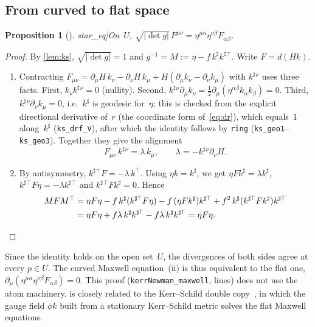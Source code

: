 \documentclass[11pt]{article}
\newtheorem{proposition}[theorem]{Proposition}
\theoremstyle{definition}
\theoremstyle{remark}
\newcommand{\lean}[1]{\lstinline[basicstyle=\ttfamily\normalsize,columns=fullflexible,breaklines=false]{#1}}
\newcommand{\ksharp}{k^{\sharp}}
\begin{document}
\subsection{From curved to flat space}\label{sec:curved-to-flat}

\begin{proposition}[\lean{star_eq}]\label{prop:flat}
On~$U$, $\sqrt{|\det g|}\,F^{\mu\nu}=\eta^{\mu\alpha}\eta^{\nu\beta}F_{\alpha\beta}$.
\end{proposition}
\begin{proof}
By \cref{lem:ks}, $\sqrt{|\det g|}=1$ and $g^{-1}=M:=\eta-f\,\ksharp\ksharp{}^{\!\top}$.
Write $F=d(Hk)$.
\begin{enumerate}[label=(\roman*)]
  \item Contracting $F_{\mu\nu}=\partial_\mu H\,k_\nu-\partial_\nu H\,k_\mu+H(\partial_\mu k_\nu-\partial_\nu k_\mu)$ with $\ksharp{}^\nu$ uses three facts.
  First, $k_\nu\ksharp{}^\nu=0$ (nullity).
  Second, $\ksharp{}^\nu\partial_\mu k_\nu=\frac12\partial_\mu(\eta^{\alpha\beta}k_\alpha k_\beta)=0$.
  Third, $\ksharp{}^\nu\partial_\nu k_\mu=0$, i.e.\ $\ksharp$ is geodesic for~$\eta$; this is checked from the explicit directional derivative of~$r$ (the coordinate form of~\eqref{eq:dr}), which equals~$1$ along~$\ksharp$ (\lean{ks_drf_V}), after which the identity follows by \lean{ring} (\lean{ks_geo1}--\lean{ks_geo3}).
  Together they give the alignment
  \[
    F_{\mu\nu}\,\ksharp{}^\nu=\lambda\,k_\mu,\qquad \lambda=-\ksharp{}^\nu\partial_\nu H .
  \]
  \item By antisymmetry, $\ksharp{}^{\!\top}F=-\lambda\,k^{\top}$.
  Using $\eta k=\ksharp$, we get $\eta F\ksharp=\lambda\ksharp$, $\ksharp{}^{\!\top}F\eta=-\lambda\ksharp{}^{\!\top}$ and $\ksharp{}^{\!\top}F\ksharp=0$.
  Hence
  \begin{align*}
    MFM^{\top}&=\eta F\eta-f\,\ksharp(\ksharp{}^{\!\top}F\eta)-f\,(\eta F\ksharp)\ksharp{}^{\!\top}+f^2\,\ksharp(\ksharp{}^{\!\top}F\ksharp)\ksharp{}^{\!\top}\\
    &=\eta F\eta+f\lambda\,\ksharp\ksharp{}^{\!\top}-f\lambda\,\ksharp\ksharp{}^{\!\top}=\eta F\eta.\qedhere
  \end{align*}
\end{enumerate}
\end{proof}
\noindent Since the identity holds on the open set~$U$, the divergences of both sides agree at every $p\in U$.
The curved Maxwell equation~(ii) is thus equivalent to the flat one, $\partial_\mu(\eta^{\mu\alpha}\eta^{\nu\beta}F_{\alpha\beta})=0$.
This proof (\lean{kerrNewman_maxwell}, \NumLinesMaxwell{} lines) does not use the atom machinery.
 is closely related to the Kerr--Schild double copy~\cite{monteiro2014}, in which the gauge field $\phi k$ built from a stationary Kerr--Schild metric solves the flat Maxwell equations.
\end{document}
